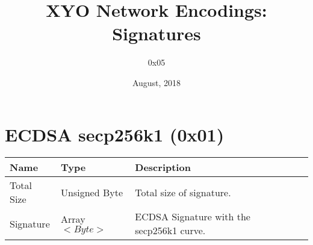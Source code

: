 \documentclass[11pt]{article}
\title{XYO Network Encodings: Signatures}
\author{0x05}
\date{August, 2018}
\begin{document}
\maketitle

\section{ECDSA secp256k1 (0x01)}

\begin{center}
\begin{tabular}{ |l|l|l|l| } 
\hline
\textbf{Name} & \textbf{Type} & \textbf{Description}\\
\hline
Total Size & Unsigned Byte & Total size of signature. \\
Signature & Array$<Byte>$ & ECDSA Signature with the secp256k1 curve.\\ 
   
\hline
\end{tabular}
\end{center}
\end{document}
